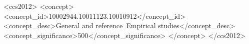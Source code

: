 \documentclass[sigconf,natbib=false]{acmart}
\begin{document}
% 

\begin{CCSXML}
<ccs2012>
<concept>
<concept_id>10002944.10011123.10010912</concept_id>
<concept_desc>General and reference~Empirical studies</concept_desc>
<concept_significance>500</concept_significance>
</concept>
</ccs2012>
\end{CCSXML}





\maketitle
\end{document}

